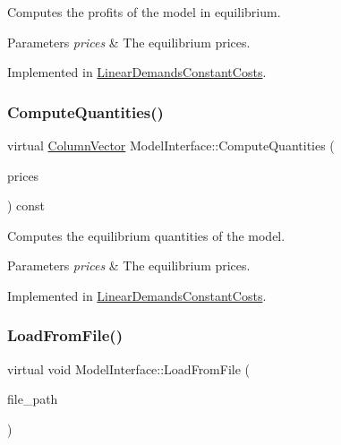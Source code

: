 Computes the profits of the model in equilibrium.


\begin{DoxyParams}{Parameters}
{\em prices} & The equilibrium prices. \\
\hline
\end{DoxyParams}


Implemented in \hyperlink{classLinearDemandsConstantCosts_a48b52dab01d2cf45beae51eab615f7ae}{Linear\+Demands\+Constant\+Costs}.

\mbox{\label{classModelInterface_af9a936f6f0d1b1f0f2c5bf35785e7db4}} 
\subsubsection{\texorpdfstring{Compute\+Quantities()}{ComputeQuantities()}}
{\footnotesize\ttfamily virtual \hyperlink{classColumnVector}{Column\+Vector} Model\+Interface\+::\+Compute\+Quantities (\begin{DoxyParamCaption}\item[{\hyperlink{classColumnVector}{Column\+Vector} const \&}]{prices }\end{DoxyParamCaption}) const\hspace{0.3cm}{\ttfamily [pure virtual]}}

Computes the equilibrium quantities of the model.


\begin{DoxyParams}{Parameters}
{\em prices} & The equilibrium prices. \\
\hline
\end{DoxyParams}


Implemented in \hyperlink{classLinearDemandsConstantCosts_a310864e458935098502561540a71a88c}{Linear\+Demands\+Constant\+Costs}.

\mbox{\label{classModelInterface_a7f408fdb15c10ce8cabf6b942bbc9c38}} 
\subsubsection{\texorpdfstring{Load\+From\+File()}{LoadFromFile()}}
{\footnotesize\ttfamily virtual void Model\+Interface\+::\+Load\+From\+File (\begin{DoxyParamCaption}\item[{std\+::string const \&}]{file\+\_\+path }\end{DoxyParamCaption})\hspace{0.3cm}{\ttfamily [pure virtual]}}

